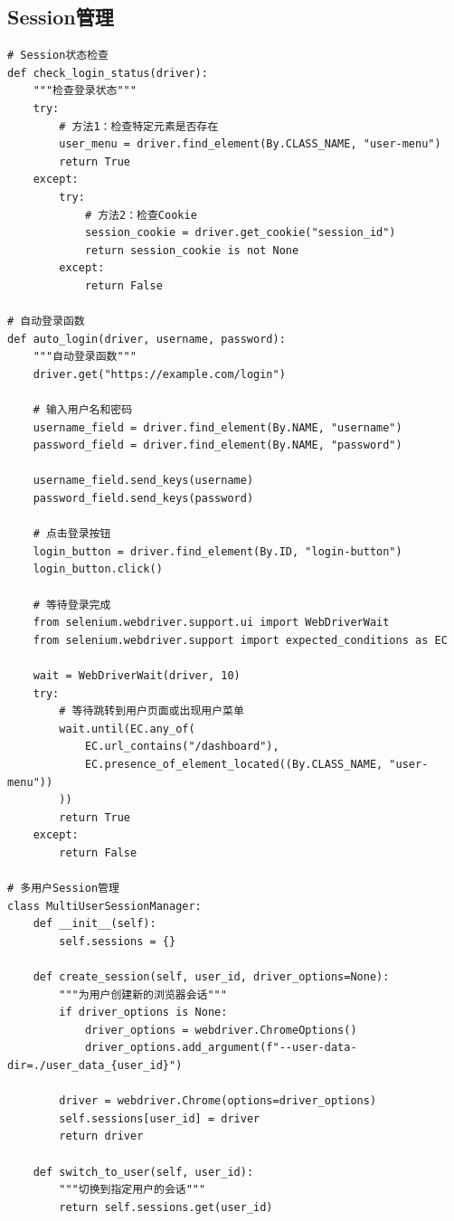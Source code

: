\subsection{Session管理}

\begin{lstlisting}[style=demostyle,numbers=none]
# Session状态检查
def check_login_status(driver):
    """检查登录状态"""
    try:
        # 方法1：检查特定元素是否存在
        user_menu = driver.find_element(By.CLASS_NAME, "user-menu")
        return True
    except:
        try:
            # 方法2：检查Cookie
            session_cookie = driver.get_cookie("session_id")
            return session_cookie is not None
        except:
            return False

# 自动登录函数
def auto_login(driver, username, password):
    """自动登录函数"""
    driver.get("https://example.com/login")
    
    # 输入用户名和密码
    username_field = driver.find_element(By.NAME, "username")
    password_field = driver.find_element(By.NAME, "password")
    
    username_field.send_keys(username)
    password_field.send_keys(password)
    
    # 点击登录按钮
    login_button = driver.find_element(By.ID, "login-button")
    login_button.click()
    
    # 等待登录完成
    from selenium.webdriver.support.ui import WebDriverWait
    from selenium.webdriver.support import expected_conditions as EC
    
    wait = WebDriverWait(driver, 10)
    try:
        # 等待跳转到用户页面或出现用户菜单
        wait.until(EC.any_of(
            EC.url_contains("/dashboard"),
            EC.presence_of_element_located((By.CLASS_NAME, "user-menu"))
        ))
        return True
    except:
        return False

# 多用户Session管理
class MultiUserSessionManager:
    def __init__(self):
        self.sessions = {}
    
    def create_session(self, user_id, driver_options=None):
        """为用户创建新的浏览器会话"""
        if driver_options is None:
            driver_options = webdriver.ChromeOptions()
            driver_options.add_argument(f"--user-data-dir=./user_data_{user_id}")
        
        driver = webdriver.Chrome(options=driver_options)
        self.sessions[user_id] = driver
        return driver
    
    def switch_to_user(self, user_id):
        """切换到指定用户的会话"""
        return self.sessions.get(user_id)
    

\end{lstlisting}
